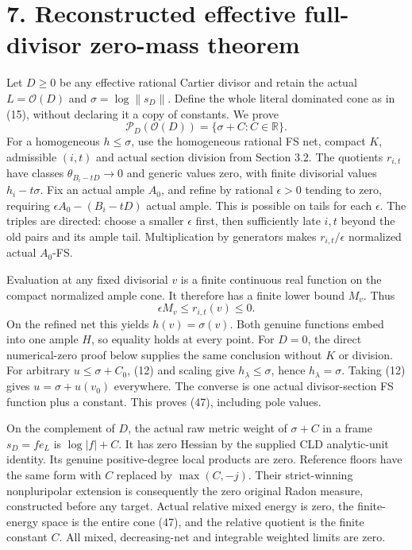 \documentclass[
  10pt,
]{article}
\begin{document}
\section{7. Reconstructed effective full-divisor zero-mass
theorem}\label{reconstructed-effective-full-divisor-zero-mass-theorem}

Let \(D\geq0\) be any effective rational Cartier divisor and retain the
actual \(L=\mathcal O(D)\) and \(\sigma=\log\|s_D\|\). Define the whole
literal dominated cone as in (15), without declaring it a copy of
constants. We prove
\[\mathcal P_D(\mathcal O(D))=\{\sigma+C:C\in\mathbb R\}.\tag{47}\] For
a homogeneous \(h\leq\sigma\), use the homogeneous rational FS net,
compact \(K\), admissible \((i,t)\) and actual section division from
Section 3.2. The quotients \(r_{i,t}\) have classes
\(\theta_{B_i-tD}\to0\) and generic values zero, with finite divisorial
values \(h_i-t\sigma\). Fix an actual ample \(A_0\), and refine by
rational \(\epsilon>0\) tending to zero, requiring
\(\epsilon A_0-(B_i-tD)\) actual ample. This is possible on tails for
each \(\epsilon\). The triples are directed: choose a smaller
\(\epsilon\) first, then sufficiently late \(i,t\) beyond the old pairs
and its ample tail. Multiplication by generators makes
\(r_{i,t}/\epsilon\) normalized actual \(A_0\)-FS.

Evaluation at any fixed divisorial \(v\) is a finite continuous real
function on the compact normalized ample cone. It therefore has a finite
lower bound \(M_v\). Thus \[\epsilon M_v\leq r_{i,t}(v)\leq0.\tag{48}\]
On the refined net this yields \(h(v)=\sigma(v)\). Both genuine
functions embed into one ample \(H\), so equality holds at every point.
For \(D=0\), the direct numerical-zero proof below supplies the same
conclusion without \(K\) or division. For arbitrary \(u\leq\sigma+C_0\),
(12) and scaling give \(h_\lambda\leq\sigma\), hence
\(h_\lambda=\sigma\). Taking (12) gives \(u=\sigma+u(v_0)\) everywhere.
The converse is one actual divisor-section FS function plus a constant.
This proves (47), including pole values.

On the complement of \(D\), the actual raw metric weight of \(\sigma+C\)
in a frame \(s_D=f e_L\) is \(\log|f|+C\). It has zero Hessian by the
supplied CLD analytic-unit identity. Its genuine positive-degree local
products are zero. Reference floors have the same form with \(C\)
replaced by \(\max(C,-j)\). Their strict-winning nonpluripolar extension
is consequently the zero original Radon measure, constructed before any
target. Actual relative mixed energy is zero, the finite-energy space is
the entire cone (47), and the relative quotient is the finite constant
\(C\). All mixed, decreasing-net and integrable weighted limits are
zero.
\end{document}

